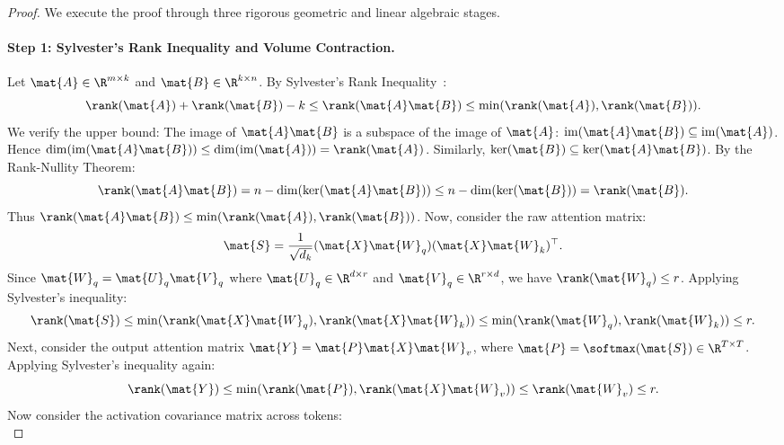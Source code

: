 \begin{proof}
We execute the proof through three rigorous geometric and linear algebraic stages.

\paragraph{Step 1: Sylvester's Rank Inequality and Volume Contraction.}
Let $\mat{A} \in \R^{m \times k}$ and $\mat{B} \in \R^{k \times n}$.
By Sylvester's Rank Inequality~\cite{golub2013matrix}:
\begin{equation}
\rank(\mat{A}) + \rank(\mat{B}) - k \le \rank(\mat{A}\mat{B}) \le \min(\rank(\mat{A}), \rank(\mat{B})).
\label{eq:sylvester_canonical}
\end{equation}
We verify the upper bound: The image of $\mat{A}\mat{B}$ is a subspace of the image of $\mat{A}$: $\operatorname{im}(\mat{A}\mat{B}) \subseteq \operatorname{im}(\mat{A})$. Hence $\dim(\operatorname{im}(\mat{A}\mat{B})) \le \dim(\operatorname{im}(\mat{A})) = \rank(\mat{A})$.
Similarly, $\operatorname{ker}(\mat{B}) \subseteq \operatorname{ker}(\mat{A}\mat{B})$. By the Rank-Nullity Theorem:
\begin{equation}
\rank(\mat{A}\mat{B}) = n - \dim(\operatorname{ker}(\mat{A}\mat{B})) \le n - \dim(\operatorname{ker}(\mat{B})) = \rank(\mat{B}).
\end{equation}
Thus $\rank(\mat{A}\mat{B}) \le \min(\rank(\mat{A}), \rank(\mat{B}))$.
Now, consider the raw attention matrix:
\begin{equation}
\mat{S} = \frac{1}{\sqrt{d_k}} (\mat{X} \mat{W}_q) (\mat{X} \mat{W}_k)^\top.
\end{equation}
Since $\mat{W}_q = \mat{U}_q \mat{V}_q$ where $\mat{U}_q \in \R^{d \times r}$ and $\mat{V}_q \in \R^{r \times d}$, we have $\rank(\mat{W}_q) \le r$.
Applying Sylvester's inequality:
\begin{equation}
\rank(\mat{S}) \le \min(\rank(\mat{X}\mat{W}_q), \rank(\mat{X}\mat{W}_k)) \le \min(\rank(\mat{W}_q), \rank(\mat{W}_k)) \le r.
\end{equation}
Next, consider the output attention matrix $\mat{Y} = \mat{P} \mat{X} \mat{W}_v$, where $\mat{P} = \softmax(\mat{S}) \in \R^{T \times T}$.
Applying Sylvester's inequality again:
\begin{equation}
\rank(\mat{Y}) \le \min(\rank(\mat{P}), \rank(\mat{X} \mat{W}_v)) \le \rank(\mat{W}_v) \le r.
\end{equation}
Now consider the activation covariance matrix across tokens:
\begin{equation}

\end{equation}
\end{proof}
